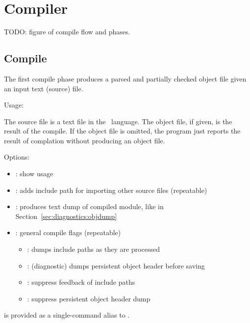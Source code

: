 
\chapter{Compiler}
\label{sec:compiler}

TODO: figure of compile flow and phases.

\section{Compile}
\label{sec:compiler:compile}

The first compile phase produces a parsed and partially checked object
file given an input text (source) file.  

Usage:
\binhackt {} \ttt{[}\ttt{]}  
	\ttt{[}\ttt{]}

The source file is a text file in the \HAC\ language.  
The object file, if given, is the result of the compile.  
If the object file is omitted, the program just reports the result
of complation without producing an object file.  

Options:
\begin{itemize}
\item {}: show usage
\item {}  : adds include path for importing other source files (repeatable)
\item {}: produces text dump of compiled module, like  in Section~\ref{sec:diagnostics:objdump}
\item {}  : general compile flags (repeatable)
\begin{itemize}
	\item {}: 
		dumps  include paths as they are processed
	\item {}: 
		(diagnostic) dumps persistent object header before saving
	\item {}: 
		suppress feedback of  include paths
	\item {}: 
		suppress persistent object header dump
\end{itemize}
\end{itemize}

 is provided as a single-command alias to .  

